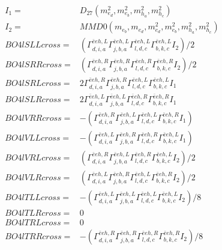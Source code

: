 \documentclass[A4,landscape]{article}
\begin{document}
\begin{align} 
I_1 = & D_{27}(m^2_{e_{{d}}}, m^2_{e_{{b}}}, m^2_{h_{{a}}}, m^2_{h_{{c}}}) \\ 
I_2 = & MMD0(m_{e_{{b}}}, m_{e_{{d}}}, m^2_{e_{{d}}}, m^2_{e_{{b}}}, m^2_{h_{{a}}}, m^2_{h_{{c}}}) \\ 
  BO4lSLLcross= & ( \Gamma^{\bar{e}e h ,L}_{d, i, a} \Gamma^{\bar{e}e h ,L}_{j, b, a} \Gamma^{\bar{e}e h ,L}_{l, d, c} \Gamma^{\bar{e}e h ,L}_{b, k, c} I_2)/2 \\ 
  BO4lSRRcross= & ( \Gamma^{\bar{e}e h ,R}_{d, i, a} \Gamma^{\bar{e}e h ,R}_{j, b, a} \Gamma^{\bar{e}e h ,R}_{l, d, c} \Gamma^{\bar{e}e h ,R}_{b, k, c} I_2)/2 \\ 
  BO4lSRLcross= & 2  \Gamma^{\bar{e}e h ,R}_{d, i, a} \Gamma^{\bar{e}e h ,R}_{j, b, a} \Gamma^{\bar{e}e h ,L}_{l, d, c} \Gamma^{\bar{e}e h ,L}_{b, k, c} I_1 \\ 
  BO4lSLRcross= & 2  \Gamma^{\bar{e}e h ,L}_{d, i, a} \Gamma^{\bar{e}e h ,L}_{j, b, a} \Gamma^{\bar{e}e h ,R}_{l, d, c} \Gamma^{\bar{e}e h ,R}_{b, k, c} I_1 \\ 
  BO4lVRRcross= & -( \Gamma^{\bar{e}e h ,R}_{d, i, a} \Gamma^{\bar{e}e h ,L}_{j, b, a} \Gamma^{\bar{e}e h ,L}_{l, d, c} \Gamma^{\bar{e}e h ,R}_{b, k, c} I_1) \\ 
  BO4lVLLcross= & -( \Gamma^{\bar{e}e h ,L}_{d, i, a} \Gamma^{\bar{e}e h ,R}_{j, b, a} \Gamma^{\bar{e}e h ,R}_{l, d, c} \Gamma^{\bar{e}e h ,L}_{b, k, c} I_1) \\ 
  BO4lVRLcross= & ( \Gamma^{\bar{e}e h ,R}_{d, i, a} \Gamma^{\bar{e}e h ,L}_{j, b, a} \Gamma^{\bar{e}e h ,R}_{l, d, c} \Gamma^{\bar{e}e h ,L}_{b, k, c} I_2)/2 \\ 
  BO4lVLRcross= & ( \Gamma^{\bar{e}e h ,L}_{d, i, a} \Gamma^{\bar{e}e h ,R}_{j, b, a} \Gamma^{\bar{e}e h ,L}_{l, d, c} \Gamma^{\bar{e}e h ,R}_{b, k, c} I_2)/2 \\ 
  BO4lTLLcross= & -( \Gamma^{\bar{e}e h ,L}_{d, i, a} \Gamma^{\bar{e}e h ,L}_{j, b, a} \Gamma^{\bar{e}e h ,L}_{l, d, c} \Gamma^{\bar{e}e h ,L}_{b, k, c} I_2)/8 \\ 
  BO4lTLRcross= & 0 \\ 
  BO4lTRLcross= & 0 \\ 
  BO4lTRRcross= & -( \Gamma^{\bar{e}e h ,R}_{d, i, a} \Gamma^{\bar{e}e h ,R}_{j, b, a} \Gamma^{\bar{e}e h ,R}_{l, d, c} \Gamma^{\bar{e}e h ,R}_{b, k, c} I_2)/8 \\ 
\end{align} 
\end{document}
